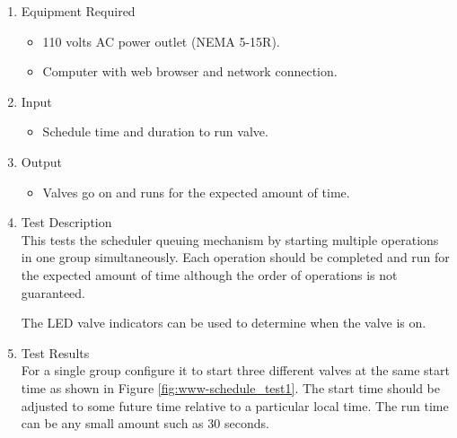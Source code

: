 \documentclass{article}
\begin{document}
\begin{enumerate}
\item Equipment Required
	\begin{itemize}
	\item 110 volts AC power outlet (NEMA 5-15R).
	\item Computer with web browser and network connection.
	\end{itemize}
\item Input
	\begin{itemize}
	\item Schedule time and duration to run valve.
	\end{itemize}
\item Output
	\begin{itemize}
	\item Valves go on and runs for the expected amount of time.
	\end{itemize}

\item Test Description \\

This tests the scheduler queuing mechanism by starting multiple
operations in one group simultaneously.
Each operation should be completed and run for the expected amount
of time although the order of operations is not guaranteed.

The LED valve indicators can be used to determine when the valve is on.

\pagebreak
\item Test Results \\
	\vspace{1em}
	For a single group configure it to start three different valves
	at the same start time as shown in Figure \ref{fig:www-schedule_test1}.
	The start time should be adjusted to some future time relative
	to a particular local time.
	The run time can be any small amount such as 30 seconds. \\


\end{enumerate}
\end{document}
